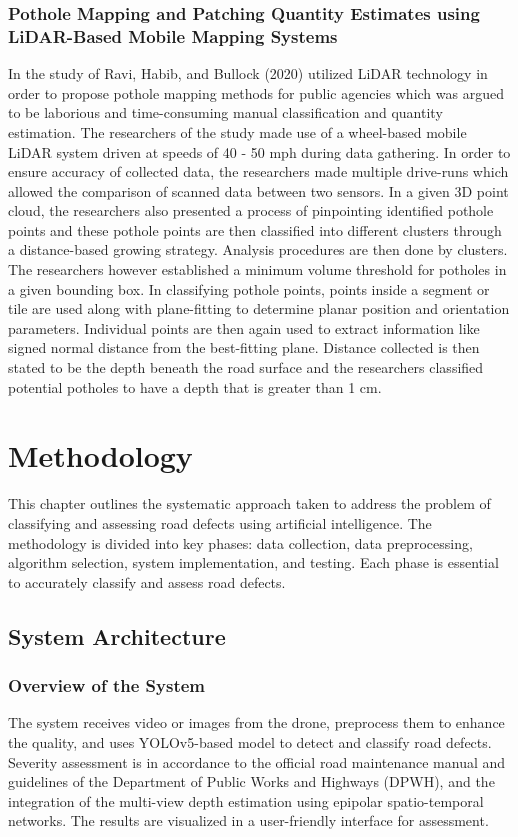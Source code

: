 \documentclass{report} %
\begin{document}
	\subsection{Pothole Mapping and Patching Quantity Estimates using LiDAR-Based Mobile Mapping Systems}
		In the study of Ravi, Habib, and Bullock (2020) utilized LiDAR technology in order to propose pothole mapping methods for public agencies which was argued to be laborious and time-consuming manual classification and quantity estimation. The researchers of the study made use of a wheel-based mobile LiDAR system driven at speeds of 40 - 50 mph during data gathering. In order to ensure accuracy of collected data, the researchers made multiple drive-runs which allowed the comparison of scanned data between two sensors. In a given 3D point cloud,  the researchers also presented a process of pinpointing identified pothole points and these pothole points are then classified into different clusters through a distance-based growing strategy. Analysis procedures are then done by clusters. The researchers however established a minimum volume threshold for potholes in a given bounding box. In classifying pothole points, points inside a segment or tile are used along with plane-fitting to determine planar position and orientation parameters. Individual points are then again used to extract information like signed normal distance from the best-fitting plane. Distance collected is then stated to be the depth beneath the road surface and the researchers classified potential potholes to have a depth that is greater than 1 cm.

		\chapter{Methodology}
		This chapter outlines the systematic approach taken to address the problem of classifying and assessing road defects using artificial intelligence. The methodology is divided into key phases: data collection, data preprocessing, algorithm selection, system implementation, and testing. Each phase is essential to accurately classify and assess road defects.
		\section{System Architecture}
		
		\subsection{Overview of the System}
		The system receives video or images from the drone, preprocess them to enhance the quality, and uses YOLOv5-based model to detect and classify road defects. Severity assessment is in accordance to the official road maintenance manual and guidelines of the Department of Public Works and Highways (DPWH), and the integration of the multi-view depth estimation using epipolar spatio-temporal networks. The results are visualized in a user-friendly interface for assessment. 
		
\end{document}
